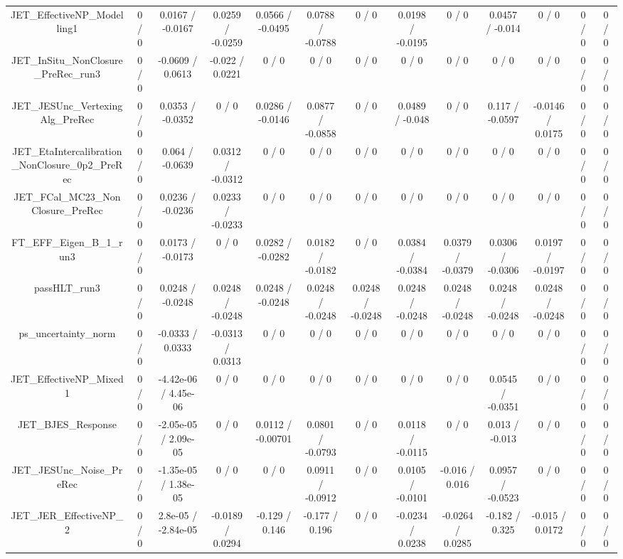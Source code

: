 \documentclass[10pt]{article}
\begin{document}
\begin{table}[htbp]
\begin{center}
\begin{tabular}{|c|c|c|c|c|c|c|c|c|c|c|c|c|}
  JET_EffectiveNP_Modelling1 & 0 / 0 & 0.0167 / -0.0167 & 0.0259 / -0.0259 & 0.0566 / -0.0495 & 0.0788 / -0.0788 & 0 / 0 & 0.0198 / -0.0195 & 0 / 0 & 0.0457 / -0.014 & 0 / 0 & 0 / 0 & 0 / 0 \\ 
  JET_InSitu_NonClosure_PreRec_run3 & 0 / 0 & -0.0609 / 0.0613 & -0.022 / 0.0221 & 0 / 0 & 0 / 0 & 0 / 0 & 0 / 0 & 0 / 0 & 0 / 0 & 0 / 0 & 0 / 0 & 0 / 0 \\ 
  JET_JESUnc_VertexingAlg_PreRec & 0 / 0 & 0.0353 / -0.0352 & 0 / 0 & 0.0286 / -0.0146 & 0.0877 / -0.0858 & 0 / 0 & 0.0489 / -0.048 & 0 / 0 & 0.117 / -0.0597 & -0.0146 / 0.0175 & 0 / 0 & 0 / 0 \\ 
  JET_EtaIntercalibration_NonClosure_0p2_PreRec & 0 / 0 & 0.064 / -0.0639 & 0.0312 / -0.0312 & 0 / 0 & 0 / 0 & 0 / 0 & 0 / 0 & 0 / 0 & 0 / 0 & 0 / 0 & 0 / 0 & 0 / 0 \\ 
  JET_FCal_MC23_NonClosure_PreRec & 0 / 0 & 0.0236 / -0.0236 & 0.0233 / -0.0233 & 0 / 0 & 0 / 0 & 0 / 0 & 0 / 0 & 0 / 0 & 0 / 0 & 0 / 0 & 0 / 0 & 0 / 0 \\ 
  FT_EFF_Eigen_B_1_run3 & 0 / 0 & 0.0173 / -0.0173 & 0 / 0 & 0.0282 / -0.0282 & 0.0182 / -0.0182 & 0 / 0 & 0.0384 / -0.0384 & 0.0379 / -0.0379 & 0.0306 / -0.0306 & 0.0197 / -0.0197 & 0 / 0 & 0 / 0 \\ 
  passHLT_run3 & 0 / 0 & 0.0248 / -0.0248 & 0.0248 / -0.0248 & 0.0248 / -0.0248 & 0.0248 / -0.0248 & 0.0248 / -0.0248 & 0.0248 / -0.0248 & 0.0248 / -0.0248 & 0.0248 / -0.0248 & 0.0248 / -0.0248 & 0 / 0 & 0 / 0 \\ 
  ps_uncertainty_norm & 0 / 0 & -0.0333 / 0.0333 & -0.0313 / 0.0313 & 0 / 0 & 0 / 0 & 0 / 0 & 0 / 0 & 0 / 0 & 0 / 0 & 0 / 0 & 0 / 0 & 0 / 0 \\ 
  JET_EffectiveNP_Mixed1 & 0 / 0 & -4.42e-06 / 4.45e-06 & 0 / 0 & 0 / 0 & 0 / 0 & 0 / 0 & 0 / 0 & 0 / 0 & 0.0545 / -0.0351 & 0 / 0 & 0 / 0 & 0 / 0 \\ 
  JET_BJES_Response & 0 / 0 & -2.05e-05 / 2.09e-05 & 0 / 0 & 0.0112 / -0.00701 & 0.0801 / -0.0793 & 0 / 0 & 0.0118 / -0.0115 & 0 / 0 & 0.013 / -0.013 & 0 / 0 & 0 / 0 & 0 / 0 \\ 
  JET_JESUnc_Noise_PreRec & 0 / 0 & -1.35e-05 / 1.38e-05 & 0 / 0 & 0 / 0 & 0.0911 / -0.0912 & 0 / 0 & 0.0105 / -0.0101 & -0.016 / 0.016 & 0.0957 / -0.0523 & 0 / 0 & 0 / 0 & 0 / 0 \\ 
  JET_JER_EffectiveNP_2 & 0 / 0 & 2.8e-05 / -2.84e-05 & -0.0189 / 0.0294 & -0.129 / 0.146 & -0.177 / 0.196 & 0 / 0 & -0.0234 / 0.0238 & -0.0264 / 0.0285 & -0.182 / 0.325 & -0.015 / 0.0172 & 0 / 0 & 0 / 0 \\ 

\end{tabular}
\end{center}
\end{table}
\end{document}
